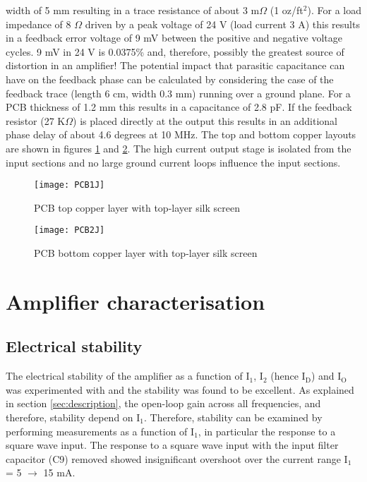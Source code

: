 \documentclass[a4paper,10pt, oneside]{article}
\begin{document}
width of 5 mm resulting in a trace resistance of about 3 m$\Omega$ (1 oz/ft$^{2}$). For a load impedance of 8 $\Omega$ driven by a peak 
voltage of 24 V (load current 3 A) this results in a feedback error voltage of 9 mV between the positive and negative voltage cycles. 
9 mV in 24 V is 0.0375\% and, therefore, possibly the greatest source of distortion in an amplifier!
The potential impact that parasitic capacitance can have on the feedback phase can be calculated by considering the case of the feedback 
trace (length 6 cm, width 0.3 mm) running over a ground plane. For a PCB thickness of 1.2 mm this results in a capacitance of 2.8 pF. 
If the feedback resistor (27 K$\Omega$) is placed directly at the output this results in an additional phase delay of about 4.6 degrees at 10 MHz. The top and bottom copper layouts are shown in figures \ref{top} and \ref{bottom}. The high current output stage is isolated from the
input sections and no large ground current loops influence the input sections. 

 \begin{figure}[H]
 	\texttt{[image: PCB1J]}
 	\caption{PCB top copper layer with top-layer silk screen}
 	\label{top}
 \end{figure}

 \begin{figure}[H]
 	\texttt{[image: PCB2J]}
 	\caption{PCB bottom copper layer with top-layer silk screen}
 	\label{bottom}
 \end{figure}
   
\section{Amplifier characterisation} \label{sec:characterisation}
\subsection*{Electrical stability}
The electrical stability of the amplifier as a function of $\textrm{I}_{1}$, $\textrm{I}_{2}$ (hence $\textrm{I}_{\textrm{D}}$) and $\textrm{I}_{\textrm{O}}$ was experimented with and the stability was found to be excellent. As explained in section \ref{sec:description}, the open-loop gain across all frequencies, and therefore, stability depend on $\textrm{I}_{1}$. Therefore, stability can be examined by performing measurements as a function of $\textrm{I}_{1}$, in particular the response to a square wave input. The response to a square wave input with the input filter capacitor (C9) removed showed insignificant overshoot over the current range $\textrm{I}_{1}$ = 5 $\to$ 15 mA. 
\end{document}
